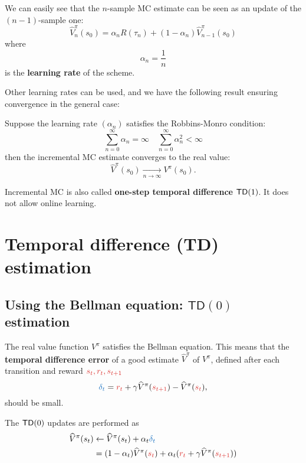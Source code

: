 \documentclass[../course-notes.tex]{subfiles}
\begin{document}
We can easily see that the $n$-sample MC estimate can be seen as an update of the $(n-1)$-sample one:
\[
	\widehat{V}_{n}^\pi(s_0) = \alpha_n R(\tau_{n}) + (1-\alpha_n) \widehat{V}^\pi_{n-1}(s_0)
\]
where
\[
	\alpha_n = \frac{1}{n}
\]
is the \textbf{learning rate} of the scheme.

Other learning rates can be used, and we have the following result ensuring convergence in the general case:
\begin{prop}
	Suppose the learning rate $(\alpha_n)$ satisfies the Robbins-Monro condition:
	\begin{equation}
	\sum_{n=0}^{\infty} \alpha_n = \infty \quad
	\sum_{n=0}^{\infty} \alpha_n^2 < \infty
	\end{equation}
	then the incremental MC estimate converges to the real value:
	\[
		\widehat{V}^\pi(s_0) \xrightarrow[n\to\infty]{} V^\pi(s_0).
	\]
\end{prop}

Incremental MC is also called \textbf{one-step temporal difference} $\mathsf{TD}(1)$. It does not allow online learning.



\section{Temporal difference (TD) estimation}

\subsection{Using the Bellman equation: $\mathsf{TD}(0)$ estimation}

The real value function $V^\pi$ satisfies the Bellman equation. This means that the \textbf{\bluefont temporal difference error} of a good estimate $\widehat{V}^\pi$ of $V^\pi$, defined after each transition and reward ${\redfont s_t,r_t,s_{t+1}}$
\begin{equation}\label{eq:ValueTDerror}
	{\bluefont\delta_t} = {\redfont r_t} + \gamma \widehat{V}^\pi({\redfont s_{t+1}}) - \widehat{V}^\pi({\redfont s_t}),
\end{equation}
should be small.

The $\mathsf{TD}(0)$ updates are performed as
\begin{align*}
	\widehat{V}^\pi(s_t) &\leftarrow
	\widehat{V}^\pi(s_t) + \alpha_t {\bluefont \delta_t} \\
	&= (1 - \alpha_t)\widehat{V}^\pi({\redfont s_t}) + \alpha_t ({\redfont r_t} + \gamma \widehat{V}^\pi({\redfont s_{t+1}}))
\end{align*}
\end{document}
